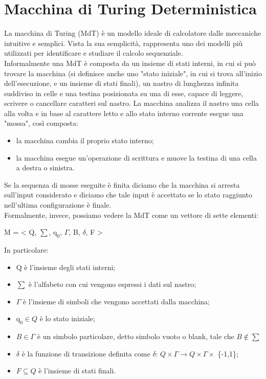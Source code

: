\section{Macchina di Turing Deterministica}
La macchina di Turing (MdT) è un modello ideale di calcolatore dalle meccaniche intuitive e semplici. Vista la sua semplicità, rappresenta uno dei modelli più utilizzati per identificare e studiare il calcolo sequenziale.\\
Informalmente una MdT è composta da un insieme di stati interni, in cui si può trovare la macchina (si definisce anche uno "stato iniziale", in cui si trova all'inizio dell'esecuzione, e un insieme di stati finali), un nastro di lunghezza infinita suddiviso in celle e una testina posizionata su una di esse, capace di leggere, scrivere o cancellare caratteri sul nastro. La macchina analizza il nastro una cella alla volta e in base al carattere letto e allo stato interno corrente esegue una "mossa", così composta:
\begin{itemize}
\item{la macchina cambia il proprio stato interno;}
\item{la macchina esegue un'operazione di scrittura e muove la testina di una cella a destra o sinistra.}
\end{itemize}
Se la sequenza di mosse eseguite è finita diciamo che la macchina si arresta sull'input considerato e diciamo che tale input è accettato se lo stato raggiunto nell'ultima configurazione è finale.\\
Formalmente, invece, possiamo vedere la MdT come un vettore di sette elementi:
\begin{center}
{M = < Q, $\sum$, $\mathrm{q}_{0}$, $\Gamma$, B, $\delta$, F >\\}
\end{center}
In particolare:
\begin{itemize}
\item{Q è l'insieme degli stati interni;}
\item{$\sum$ è l'alfabeto con cui vengono espressi i dati sul nastro;}
\item{$\Gamma$ è l'insieme di simboli che vengono accettati dalla macchina;}
\item{$\mathrm{q}_{0} \in Q$ è lo stato iniziale;}
\item{$B \in \Gamma$ è un simbolo particolare, detto simbolo vuoto o blank, tale che $B \not\in \sum$}
\item{$\delta$ è la funzione di transizione definita come $\delta$: $Q \times \Gamma \rightarrow  Q \times \Gamma \times$ \{-1,1\};}
\item{$F \subseteq Q$ è  l'insieme di stati finali.}
\end{itemize}
